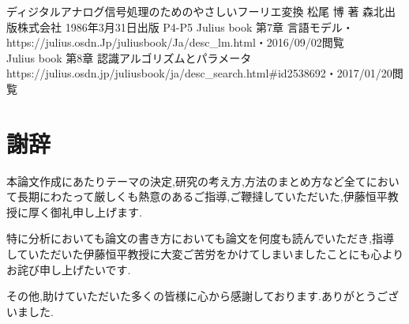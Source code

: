 \documentclass[12pt,oneside]{sotsuken_paper}
\begin{document}
\begin{thebibliography}{9}
 ディジタルアナログ信号処理のためのやさしいフーリエ変換 松尾 博 著 森北出版株式会社 1986年3月31日出版 P4-P5
 Julius book 第7章 言語モデル・https://julius.osdn.Jp/juliusbook/Ja/desc\_lm.html・2016/09/02閲覧\\
 Julius book 第8章 認識アルゴリズムとパラメータ https://julius.osdn.jp/juliusbook/ja/desc_search.html#id2538692・2017/01/20閲覧\\
\end{thebibliography}

\chapter*{謝辞}
本論文作成にあたりテーマの決定,研究の考え方,方法のまとめ方など全てにおいて長期にわたって厳しくも熱意のあるご指導,ご鞭撻していただいた,伊藤恒平教授に厚く御礼申し上げます.


特に分析においても論文の書き方においても論文を何度も読んでいただき,指導していただいた伊藤恒平教授に大変ご苦労をかけてしまいましたことにも心よりお詫び申し上げたいです.


その他,助けていただいた多くの皆様に心から感謝しております.ありがとうございました.
\end{document}
